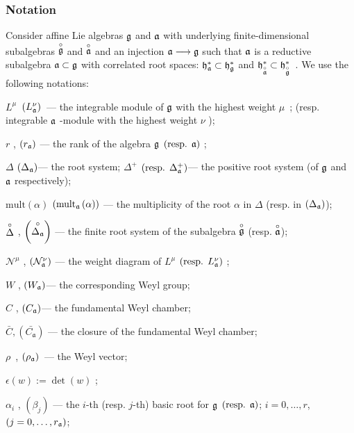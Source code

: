 \subsubsection{Notation}
\label{sec:notation}

Consider affine Lie algebras $\frak{g}$ and $\mathfrak{a}$ with
underlying finite-dimensional subalgebras $\stackrel{\circ }{\mathfrak{g}}$ and $%
\ao$ and an injection $\af\longrightarrow \frak{g%
}$ such that $\mathfrak{a}$ is a reductive subalgebra $\frak{a\subset g}$ with
correlated root spaces: $\frak{h}_{\af}^{\ast }\subset \frak{h}_{\frak{g%
}}^{\ast }$ and $\frak{h}_{\ao}^{\ast }\subset \frak{h%
}_{\go}^{\ast }$\
.
We use the following notations:

$L^{\mu }$\ $\left( L_{\mathfrak{a}}^{\nu }\right) $\ --- the integrable module
of $\frak{g}$ with the highest weight $\mu $\ ; (resp. integrable $\mathfrak{a}$
-module with the highest weight $\nu $ );

$r$ , $\left( r_{\mathfrak{a}}\right) $ --- the rank of the algebra $\frak{g}$ $%
\left( \mbox{resp. }\af\right) $ ;

$\Delta $ $\left( \Delta _{\mathfrak{a}}\right) $--- the root system; $\Delta
^{+} $ $\left( \mbox{resp. }\Delta _{\mathfrak{a}}^{+}\right) $--- the positive
root system (of $\frak{g}$ and $\mathfrak{a}$ respectively);

$\mathrm{mult}\left( \alpha \right) $ $\left( \mathrm{mult}_{\mathfrak{a}}\left(
\alpha \right) \right) $ --- the multiplicity of the root $\alpha$ in $\Delta
$ (resp. in $\left( \Delta _{\mathfrak{a}}\right) $);

$\stackrel{\circ }{\Delta}$ , $\left( \co{\Delta _{\af}}%
\right)$ --- the finite root system of the subalgebra $\co{%
\frak{g}}$ (resp. $\stackrel{\circ }{\mathfrak{a}}$);

$\mathcal{N}^{\mu }$ , $\left( \mathcal{N}_{\mathfrak{a}}^{\nu }\right) $ --- the
weight diagram of $L^{\mu }$ $\left( \mbox{resp. }L_{\mathfrak{a}}^{\nu }\right)
$ ;

$W$ , $\left( W_{\mathfrak{a}}\right) $--- the corresponding Weyl group;

$C$ , $\left( C_{\mathfrak{a}}\right) $--- the fundamental Weyl chamber;

$\bar{C}, \left(\bar{C_{\mathfrak{a}}}\right)$ --- the closure of the fundamental Weyl chamber;

$\rho $\ , $\left( \rho _{\mathfrak{a}}\right) $\ --- the Weyl vector;

$\epsilon \left( w\right) :=\det \left( w\right) $ ;

$\alpha _{i}$ , $\left( \beta _{j}\right) $ --- the $i
$-th (resp. $j$-th) basic root for $\frak{g}$ $\left( \mbox{resp. }\af%
\right) $; $i=0,\ldots ,r$,\ \ $\left( j=0,\ldots ,r_{\mathfrak{a}}\right) $;

